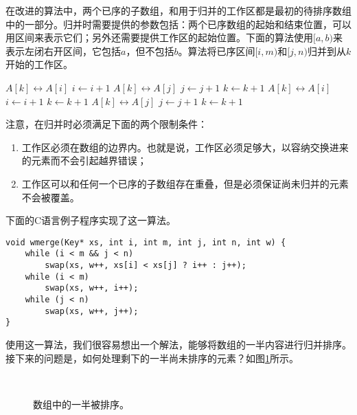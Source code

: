\documentclass[UTF8]{article}
\begin{document}
在改进的算法中，两个已序的子数组，和用于归并的工作区都是最初的待排序数组中的一部分。归并时需要提供的参数包括：两个已序数组的起始和结束位置，可以用区间来表示它们；另外还需要提供工作区的起始位置。下面的算法使用$[a, b)$来表示左闭右开区间，它包括$a$，但不包括$b$。算法将已序区间$[i, m)$和$[j, n)$归并到从$k$开始的工作区。

\begin{algorithmic}[1]
\Procedure{Merge}{$A, [i, m), [j, n), k$}
      \State {} $A[k] \leftrightarrow A[i]$
      \State $i \gets i + 1$
    \Else
      \State {} $A[k] \leftrightarrow A[j]$
      \State $j \gets j + 1$
    \EndIf
    \State $k \gets k + 1$
  \EndWhile
    \State {} $A[k] \leftrightarrow A[i]$
    \State $i \gets i + 1$
    \State $k \gets k + 1$
  \EndWhile
    \State {} $A[k] \leftrightarrow A[j]$
    \State $j \gets j + 1$
    \State $k \gets k + 1$
  \EndWhile
\EndProcedure
\end{algorithmic}

注意，在归并时必须满足下面的两个限制条件：

\begin{enumerate}
\item 工作区必须在数组的边界内。也就是说，工作区必须足够大，以容纳交换进来的元素而不会引起越界错误；
\item 工作区可以和任何一个已序的子数组存在重叠，但是必须保证尚未归并的元素不会被覆盖。
\end{enumerate}

下面的C语言例子程序实现了这一算法。

\lstset{language=C}
\begin{lstlisting}
void wmerge(Key* xs, int i, int m, int j, int n, int w) {
    while (i < m && j < n)
        swap(xs, w++, xs[i] < xs[j] ? i++ : j++);
    while (i < m)
        swap(xs, w++, i++);
    while (j < n)
        swap(xs, w++, j++);
}
\end{lstlisting}

使用这一算法，我们很容易想出一个解法，能够将数组的一半内容进行归并排序。接下来的问题是，如何处理剩下的一半尚未排序的元素？如图\ref{fig:merge-in-place-start}所示。

\begin{figure}[htbp]
 \centering
       \\
 \caption{数组中的一半被排序。}
 \label{fig:merge-in-place-start}
\end{figure}
\end{document}

